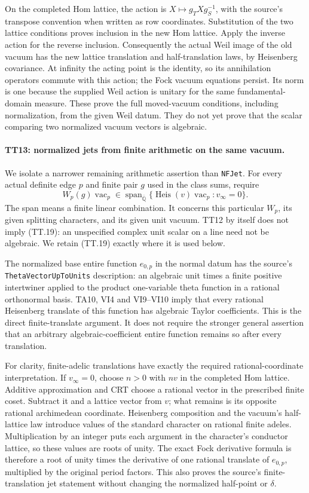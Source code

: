 On the completed Hom lattice, the action is
$X\mapsto g_T Xg_S^{-1}$, with the source's transpose convention
when written as row coordinates. Substitution of the two lattice
conditions proves inclusion in the new Hom lattice. Apply the
inverse action for the reverse inclusion. Consequently the actual
Weil image of the old vacuum has the new lattice translation and
half-translation laws, by Heisenberg covariance. At infinity the
acting point is the identity, so its annihilation operators commute
with this action; the Fock vacuum equations persist. Its norm is
one because the supplied Weil action is unitary for the same
fundamental-domain measure. These prove the full moved-vacuum
conditions, including normalization, from the given Weil datum.
They do not yet prove that the scalar comparing two normalized
vacuum vectors is algebraic.

\paragraph{TT13: normalized jets from finite arithmetic on the same vacuum.}
We isolate a narrower remaining arithmetic assertion than
\texttt{NFJet}. For every actual definite edge $p$ and finite
pair $g$ used in the class sums, require
\[
 W_p(g)\operatorname{vac}_p
       \in\operatorname{span}_{\overline{\mathbb Q}}
       \{\operatorname{Heis}(v)\operatorname{vac}_p:
                                      v_\infty=0\}.         \tag{TT.19}
\]
The span means a finite linear combination. It concerns this
particular $W_p$, its given splitting characters, and its given
unit vacuum. TT12 by itself does not imply (TT.19): an unspecified
complex unit scalar on a line need not be algebraic. We retain
(TT.19) exactly where it is used below.

The normalized base entire function $e_{0,p}$ in the normal datum
has the source's \texttt{ThetaVectorUpToUnits} description: an
algebraic unit times a finite positive intertwiner applied to the
product one-variable theta function in a rational orthonormal
basis. TA10, VI4 and VI9--VI10 imply that every rational
Heisenberg translate of this function has algebraic Taylor
coefficients. This is the direct finite-translate argument. It
does not require the stronger general assertion that an arbitrary
algebraic-coefficient entire function remains so after every
translation.

For clarity, finite-adelic translations have exactly the required
rational-coordinate interpretation. If $v_\infty=0$, choose
$n>0$ with $nv$ in the completed Hom lattice. Additive approximation
and CRT choose a rational vector in the prescribed finite coset.
Subtract it and a lattice vector from $v$; what remains is its
opposite rational archimedean coordinate. Heisenberg composition
and the vacuum's half-lattice law introduce values of the standard
character on rational finite adeles. Multiplication by an integer
puts each argument in the character's conductor lattice, so these
values are roots of unity. The exact Fock derivative formula is
therefore a root of unity times the derivative of one rational
translate of $e_{0,p}$, multiplied by the original period factors.
This also proves the source's finite-translation jet statement
without changing the normalized half-point or $\delta$.

